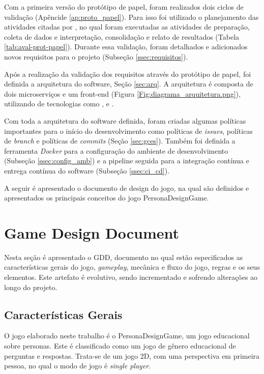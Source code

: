 {\color{textadded}

Com a primeira versão do protótipo de papel, foram realizados dois ciclos de validação (Apêncide \ref{ap:proto_papel}). Para isso foi utilizado o planejamento das atividades citadas por \citeauthor{barbosa_silva} \citeyear{barbosa_silva}, no qual foram executadas as atividades de preparação, coleta de dados e interpretação, consolidação e relato de resultados (Tabela \ref{tab:aval-prot-papel}). Durante essa validação, foram detalhados e adicionados novos requisitos para o projeto (Subseção \ref{ssec:requisitos}).

Após a realização da validação dos requisitos através do protótipo de papel, foi definida a arquitetura do software, Seção \ref{sec:arq}. A arquitetura é composta de dois microserviços e um front-end (Figura \ref{Fig:diagrama_arquitetura.png}), utilizando de tecnologias como \citeauthor{reactjs}, \citeauthor{nodejs} e \citeauthor{mysql}.

Com toda a arquitetura do software definida, foram criadas algumas políticas importantes para o início do desenvolvimento como políticas de \textit{issues}, políticas de \textit{branch} e políticas de \textit{commits} (Seção \ref{sec:gces}). Também foi definida a ferramenta \textit{Docker} para a configuração do ambiente de desenvolvimento (Subseção \ref{ssec:config_amb}) e a pipeline seguida para a integração contínua e entrega contínua do software (Subseção \ref{ssec:ci_cd}).

A seguir é apresentado o documento de design do jogo, na qual são definidos e apresentados os principais conceitos do jogo PersonaDesignGame.

}

\section{Game Design Document}
\label{sec:gdd}
Nesta seção é apresentado o GDD, documento no qual estão especificados as características gerais do jogo, \textit{gameplay}, mecânica e fluxo do jogo, regras e os seus elementos. Este artefato é evolutivo, sendo incrementado e sofrendo alterações ao longo do projeto.

\subsection{Características Gerais}

{\color{textmodified}
O jogo elaborado neste trabalho é o PersonaDesignGame, um jogo educacional sobre personas. Este é classificado como um jogo de gênero educacional de perguntas e respostas. Trata-se de um jogo 2D, com uma perspectiva em primeira pessoa, no qual o modo de jogo é \textit{single player}.
}


